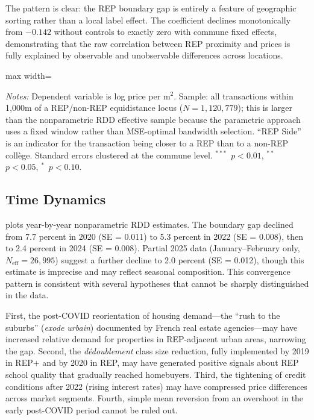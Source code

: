 \documentclass[12pt]{article}
\begin{document}
The pattern is clear: the REP boundary gap is entirely a feature of geographic sorting rather than a local label effect. The coefficient declines monotonically from $-0.142$ without controls to exactly zero with commune fixed effects, demonstrating that the raw correlation between REP proximity and prices is fully explained by observable and unobservable differences across locations.

\begin{table}[htbp]
\centering
\caption{Main Results: Parametric Boundary Estimates}
\label{tab:parametric}
\begin{adjustbox}{max width=\textwidth}

\end{adjustbox}
\begin{tablenotes}
\small
\item \textit{Notes:} Dependent variable is log price per m$^2$. Sample: all transactions within 1{,}000m of a REP/non-REP equidistance locus ($N = 1{,}120{,}779$); this is larger than the nonparametric RDD effective sample because the parametric approach uses a fixed window rather than MSE-optimal bandwidth selection. ``REP Side'' is an indicator for the transaction being closer to a REP than to a non-REP coll\`{e}ge. Standard errors clustered at the commune level. $^{***}$~$p<0.01$, $^{**}$~$p<0.05$, $^{*}$~$p<0.10$.
\end{tablenotes}
\end{table}

\subsection{Time Dynamics}

 plots year-by-year nonparametric RDD estimates. The boundary gap declined from 7.7 percent in 2020 (SE = 0.011) to 5.3 percent in 2022 (SE = 0.008), then to 2.4 percent in 2024 (SE = 0.008). Partial 2025 data (January--February only, $N_{\text{eff}} = 26{,}995$) suggest a further decline to 2.0 percent (SE = 0.012), though this estimate is imprecise and may reflect seasonal composition. This convergence pattern is consistent with several hypotheses that cannot be sharply distinguished in the data.

First, the post-COVID reorientation of housing demand---the ``rush to the suburbs'' (\textit{exode urbain}) documented by French real estate agencies---may have increased relative demand for properties in REP-adjacent urban areas, narrowing the gap. Second, the \textit{d\'{e}doublement} class size reduction, fully implemented by 2019 in REP+ and by 2020 in REP, may have generated positive signals about REP school quality that gradually reached homebuyers. Third, the tightening of credit conditions after 2022 (rising interest rates) may have compressed price differences across market segments. Fourth, simple mean reversion from an overshoot in the early post-COVID period cannot be ruled out.
\end{document}
